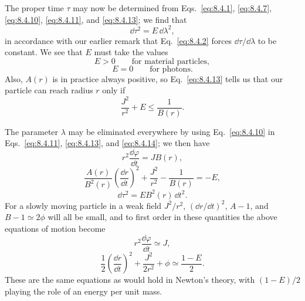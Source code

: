The proper time \(\tau\) may now be determined from
Eqs.~\eqref{eq:8.4.1}, \eqref{eq:8.4.7}, \eqref{eq:8.4.10},
\eqref{eq:8.4.11}, and \eqref{eq:8.4.13}; we find that
\begin{equation}
  \dd\tau^2=E\,\dd\lambda^2,
  \tag{8.4.14}\label{eq:8.4.14}
\end{equation}
in accordance with our earlier remark that Eq.~\eqref{eq:8.4.2} forces
\(\dd\tau/\dd\lambda\) to be constant. We see that \(E\) must take the values
\begin{equation}
  E>0\qquad\text{for material particles},
  \tag{8.4.15}\label{eq:8.4.15}
\end{equation}
\begin{equation}
  E=0\qquad\text{for photons}.
  \tag{8.4.16}\label{eq:8.4.16}
\end{equation}
Also, \(A(r)\) is in practice always positive, so
Eq.~\eqref{eq:8.4.13} tells us that our particle can reach radius \(r\)
only if
\begin{equation}
  \frac{J^2}{r^2}+E\leq\frac{1}{B(r)}.
  \tag{8.4.17}\label{eq:8.4.17}
\end{equation}

The parameter \(\lambda\) may be eliminated everywhere by using
Eq.~\eqref{eq:8.4.10} in Eqs.~\eqref{eq:8.4.11},
\eqref{eq:8.4.13}, and \eqref{eq:8.4.14}; we then have
\begin{equation}
  r^2\frac{\dd\varphi}{\dd t}=JB(r),
  \tag{8.4.18}\label{eq:8.4.18}
\end{equation}
\begin{equation}
  \frac{A(r)}{B^2(r)}
  \left(\frac{\dd r}{\dd t}\right)^2
  +\frac{J^2}{r^2}
  -\frac{1}{B(r)}
  =-E,
  \tag{8.4.19}\label{eq:8.4.19}
\end{equation}
\begin{equation}
  \dd\tau^2=EB^2(r)\,\dd t^2.
  \tag{8.4.20}\label{eq:8.4.20}
\end{equation}
For a slowly moving particle in a weak field \(J^2/r^2\),
\((\dd r/\dd t)^2\), \(A-1\), and \(B-1\simeq2\phi\) will all be small, and
to first order in these quantities the above equations of motion become
\[
  r^2\frac{\dd\varphi}{\dd t}\simeq J,
\]
\[
  \frac12\left(\frac{\dd r}{\dd t}\right)^2
  +\frac{J^2}{2r^2}+\phi
  \simeq\frac{1-E}{2}.
\]
These are the same equations as would hold in Newton's theory, with
\((1-E)/2\) playing the role of an energy per unit mass.

